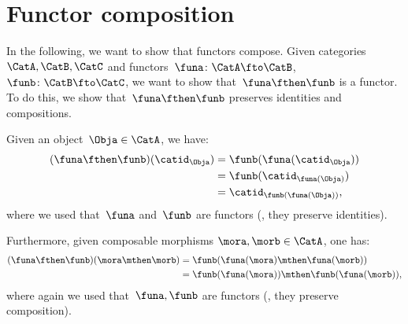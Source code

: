 

\section{Functor composition}


In the following, we want to show that functors compose.
Given categories~$\CatA,\CatB,\CatC$ and functors~$\funa\colon \CatA\fto \CatB$,~$\funb \colon \CatB\fto \CatC$, we want to show that~$\funa\fthen\funb$ is a functor. To do this, we show that~$\funa\fthen\funb$ preserves identities and compositions.
\begin{compactitem}
  \item Given an object~$\Obja\in \CatA$, we have:
  \begin{equation*}
    \begin{aligned}
    (\funa\fthen\funb)(\catid_\Obja)
      &=\funb(\funa(\catid_\Obja))\\
      &=\funb(\catid_{\funa(\Obja)})\\
      &=\catid_{\funb(\funa(\Obja))},
    \end{aligned}
  \end{equation*}
  where we used that~$\funa$ and~$\funb$ are functors (\ie , they preserve identities).
  \item Furthermore, given composable morphisms $\mora,\morb\in \CatA$, one has:
  \begin{equation*}
    \begin{aligned}
    (\funa\fthen\funb)(\mora\mthen\morb)
      &=\funb(\funa(\mora)\mthen \funa(\morb))\\
      &=\funb(\funa(\mora))\mthen \funb(\funa(\morb)),
    \end{aligned}
  \end{equation*}
  where again we used that~$\funa,\funb$ are functors (\ie , they preserve composition).
\end{compactitem}


